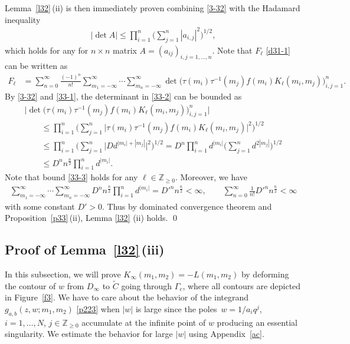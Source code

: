 \documentclass[11pt]{article}
\numberwithin{equation}{section}
\numberwithin{equation}{section}
\def\i{\infty}
\def\t{\tau}
\def\Z{\mathbb{Z}}
\begin{document}
 Lemma~\ref{l32}\,(ii) is then immediately proven
 combining \eqref{3-32} with
 the Hadamard inequality
\begin{align}
\label{33-1}
 |\det A|\le
 \prod_{i=1}^n\Bigg(\sum_{j=1}^n|a_{i,j}|^2\Bigg)^{1/2},
\end{align}
which holds for any for $n\times n$ matrix $A=(a_{ij})_{i,j=1,\dots,n}$.
 Note that $F_\ell$ \eqref{d31-1} can be written as
\begin{align}
 F_{\ell}
\label{33-2}
 &=\sum_{n=0}^{\i}\frac{(-1)^n}{n!}
 \sum_{m_1=-\i}^{\i}\cdots\sum_{m_n=-\i}^{\i}
 \det\big(\t(m_i)\t^{-1}(m_j)f(m_i)K_\ell (m_i,m_j)\big)_{i,j=1}^n.
\end{align}
 By \eqref{3-32} and \eqref{33-1},
 the determinant in \eqref{33-2} can be bounded as
\begin{gather}
 \big|\det\big(\t(m_i)\t^{-1}(m_j)f(m_i)K_\ell (m_i,m_j)\big)_{i,j=1}^n \big|
 \nonumber\\
 \qquad \le
 \prod_{i=1}^n\Bigg(\sum_{j=1}^n \big|\t(m_i)\t^{-1}(m_j)f(m_i)K_\ell (m_i,m_j)\big|^2
 \Bigg)^{1/2}
 \nonumber\\
 \qquad\le
 \prod_{i=1}^n\Bigg(\sum_{j=1}^n \big|Dd^{|m_i|+|m_j|}\big|^2
 \Bigg)^{1/2}
 =D^n \prod_{i=1}^n d^{|m_i|}\Bigg(\sum_{j=1}^n d^{2|m_j|}\Bigg)^{1/2}\nonumber\\
 \qquad \le D^n n^{\frac{n}{2}}\prod_{i=1}^n d^{|m_i|}.\label{33-3}
\end{gather}
 Note that bound \eqref{33-3} holds for any $\ell\in\Z_{\ge 0}$. Moreover, we have
\begin{gather*}
 \sum_{m_1=-\i}^{\i}\cdots\sum_{m_n=-\i}^{\i}
 D^n n^{\frac{n}{2}}\prod_{i=1}^n d^{|m_i|}
 =D'^n n^{\frac{n}{2}} <\i,
 \qquad \sum_{n=0}^{\i}\frac{1}{n!}D'^n n^{\frac{n}{2}}<\i
\end{gather*}
with some constant $D'>0$.
 Thus by dominated convergence theorem and Proposition~\ref{p33}\,(ii), Lemma \ref{l32}
 (ii) holds.
\qed



\subsection[Proof of Lemma 3.4 (iii)]{Proof of Lemma~\ref{l32}\,(iii)}
\label{s34}

 In this subsection, we will
 prove $K_{\i}(m_1,m_2)
 =-L(m_1,m_2)$ by deforming the contour of $w$
 from $D_{\infty}$ to $\tilde{C}$ going through
 $\Gamma_c$, where all contours are depicted in Figure~\ref{f3}. We have to care about the behavior of the integrand $g_{a,b}(z,w;m_1,m_2)$ \eqref{p223}
 when $|w|$ is large since the poles~${w=1/a_iq^j}$,~${i=1,\dots,N}$, $j\in\Z_{\ge 0}$ accumulate at the infinite point of $w$ producing an essential singularity.
 We estimate the behavior for large $|w|$ using Appendix~\ref{ac}.
\end{document}
